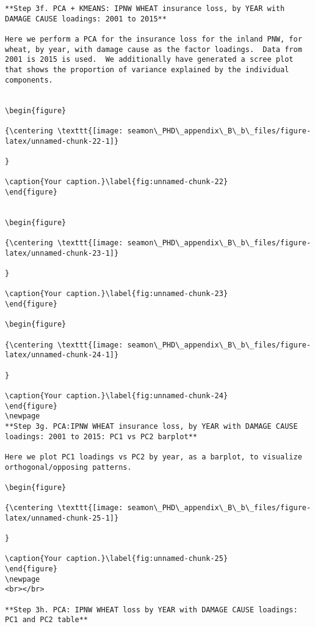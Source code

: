 \documentclass[]{article}
\begin{document}
\begin{verbatim}
**Step 3f. PCA + KMEANS: IPNW WHEAT insurance loss, by YEAR with DAMAGE CAUSE loadings: 2001 to 2015**

Here we perform a PCA for the insurance loss for the inland PNW, for wheat, by year, with damage cause as the factor loadings.  Data from 2001 is 2015 is used.  We additionally have generated a scree plot that shows the proportion of variance explained by the individual components.


\begin{figure}

{\centering \texttt{[image: seamon\_PHD\_appendix\_B\_b\_files/figure-latex/unnamed-chunk-22-1]} 

}

\caption{Your caption.}\label{fig:unnamed-chunk-22}
\end{figure}


\begin{figure}

{\centering \texttt{[image: seamon\_PHD\_appendix\_B\_b\_files/figure-latex/unnamed-chunk-23-1]} 

}

\caption{Your caption.}\label{fig:unnamed-chunk-23}
\end{figure}

\begin{figure}

{\centering \texttt{[image: seamon\_PHD\_appendix\_B\_b\_files/figure-latex/unnamed-chunk-24-1]} 

}

\caption{Your caption.}\label{fig:unnamed-chunk-24}
\end{figure}
\newpage
**Step 3g. PCA:IPNW WHEAT insurance loss, by YEAR with DAMAGE CAUSE loadings: 2001 to 2015: PC1 vs PC2 barplot**

Here we plot PC1 loadings vs PC2 by year, as a barplot, to visualize orthogonal/opposing patterns.

\begin{figure}

{\centering \texttt{[image: seamon\_PHD\_appendix\_B\_b\_files/figure-latex/unnamed-chunk-25-1]} 

}

\caption{Your caption.}\label{fig:unnamed-chunk-25}
\end{figure}
\newpage
<br></br>

**Step 3h. PCA: IPNW WHEAT loss by YEAR with DAMAGE CAUSE loadings: PC1 and PC2 table**


\end{verbatim}
\end{document}
